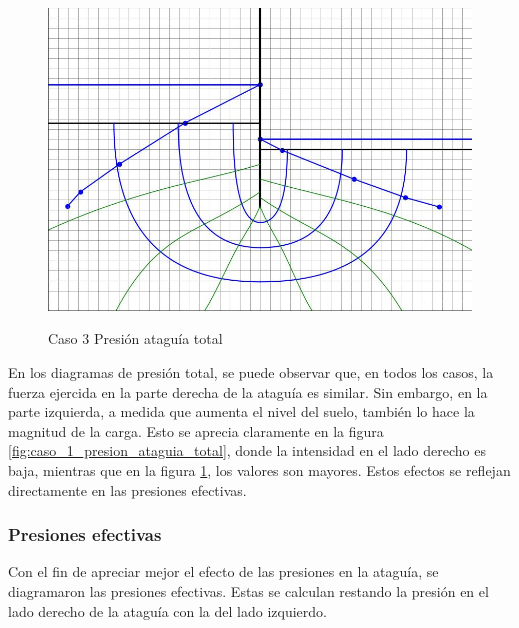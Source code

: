 \begin{figure}[H]
    \begin{minipage}{0.32\textwidth}
        \centering
        \includegraphics[width=\textwidth]{GRAFICOS/caso_3_presion_ataguia_total.jpg}
        \caption{Caso 3 Presión ataguía total}
        \label{fig:caso_3_presion_ataguia_total}
    \end{minipage}
\end{figure}

En los diagramas de presión total, se puede observar que, en todos los casos, la fuerza ejercida en la parte derecha de la ataguía es similar. Sin embargo, en la parte izquierda, a medida que aumenta el nivel del suelo, también lo hace la magnitud de la carga. Esto se aprecia claramente en la figura \ref{fig:caso_1_presion_ataguia_total}, donde la intensidad en el lado derecho es baja, mientras que en la figura \ref{fig:caso_3_presion_ataguia_total}, los valores son mayores. Estos efectos se reflejan directamente en las presiones efectivas.


\subsubsection{Presiones efectivas}

Con el fin de apreciar mejor el efecto de las presiones en la ataguía, se diagramaron las presiones efectivas. Estas se calculan restando la presión en el lado derecho de la ataguía con la del lado izquierdo.

